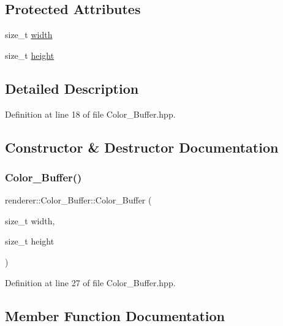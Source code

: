 \subsection*{Protected Attributes}
\begin{DoxyCompactItemize}
\item 
size\+\_\+t \mbox{\hyperlink{classrenderer_1_1_color___buffer_ace3fab0552b94a1d7d7afcc592cd4503}{width}}
\item 
size\+\_\+t \mbox{\hyperlink{classrenderer_1_1_color___buffer_a9a26f6f8e04447ac2b26c38e0a190714}{height}}
\end{DoxyCompactItemize}


\subsection{Detailed Description}


Definition at line 18 of file Color\+\_\+\+Buffer.\+hpp.



\subsection{Constructor \& Destructor Documentation}
\mbox{\label{classrenderer_1_1_color___buffer_a42e228a4ed403c292b22fe69e4f9e092}} 
\subsubsection{\texorpdfstring{Color\_Buffer()}{Color\_Buffer()}}
{\footnotesize\ttfamily renderer\+::\+Color\+\_\+\+Buffer\+::\+Color\+\_\+\+Buffer (\begin{DoxyParamCaption}\item[{size\+\_\+t}]{width,  }\item[{size\+\_\+t}]{height }\end{DoxyParamCaption})\hspace{0.3cm}{\ttfamily [inline]}}



Definition at line 27 of file Color\+\_\+\+Buffer.\+hpp.



\subsection{Member Function Documentation}
\mbox{\label{classrenderer_1_1_color___buffer_ac03bd34681ed79f8b36c9c7292db98e4}} 
